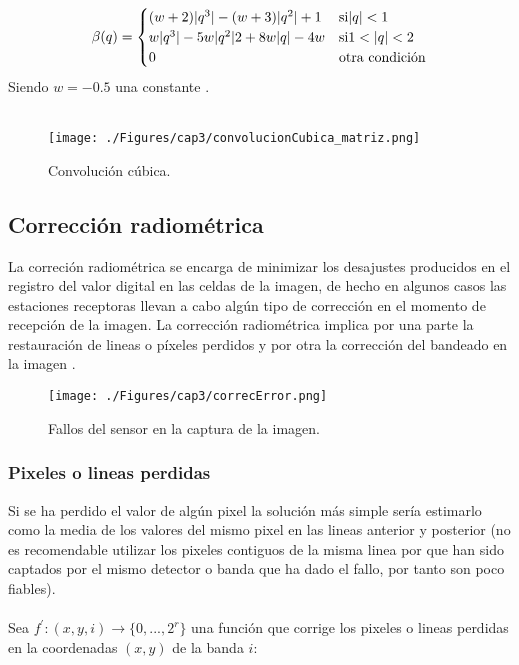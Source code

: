 \begin{itemize}
\begin{equation}
		    		\beta(q) = \begin{cases}
		    		(w+2)\lvert q^{3}\rvert-(w+3)\lvert q^{2}\rvert+1 & \text{si} \lvert q\rvert < 1 \\
		    		w\lvert q^{3}\rvert-5w\lvert q^{2}\rvert2+8w\lvert q\rvert-4w & \text{si} 1 < \lvert q\rvert < 2\\
		    		0 & \text{otra condici\'on}
		    		\end{cases}
		    		\end{equation}
		    		Siendo $ w=-0.5 $ una constante \cite{guide1999erdas}.\\~\\
		    \begin{figure}[H]
		    	\centering
		    	\texttt{[image: ./Figures/cap3/convolucionCubica\_matriz.png]}
		    	\caption{Convoluci\'on c\'ubica.}
		    	\label{fig:convCubica2}
		    \end{figure}
	\end{itemize}


\subsection{Correcci\'on radiom\'etrica}
La correci\'on radiom\'etrica se encarga de minimizar los desajustes producidos en el registro del valor digital en las celdas de la imagen, de hecho en algunos casos las estaciones receptoras llevan a cabo alg\'un tipo de correcci\'on en el momento de recepci\'on de la imagen. La corrección radiom\'etrica implica por una parte la restauraci\'on de lineas o p\'ixeles perdidos y por otra la correcci\'on del bandeado en la imagen \cite{teledUm}.
    \begin{figure}[H]
    	\centering
    	\texttt{[image: ./Figures/cap3/correcError.png]}
    	\caption{Fallos del sensor en la captura de la imagen.}
    	\label{fig:correcError}
    \end{figure}

\subsubsection{Pixeles o lineas perdidas}\label{subsec:pixelesP}
Si se ha perdido el valor de alg\'un pixel la solución m\'as simple ser\'ia estimarlo como la media de los valores
del mismo pixel en las lineas anterior y posterior (no es recomendable utilizar los pixeles contiguos de la misma linea por que han sido captados por el mismo detector o banda que ha dado el fallo, por tanto son poco fiables).\\~\\
Sea $ f^{'}:(x,y,i)\longrightarrow \{0,...,2^{r}\} $ una funci\'on que corrige los pixeles o lineas perdidas en la coordenadas $ (x,y) $ de la banda $ i $:

